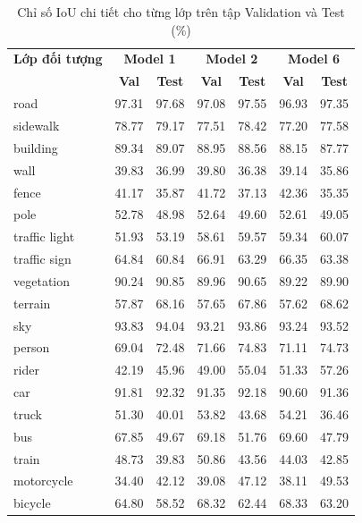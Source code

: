 \documentclass[a4paper,12pt]{report}
\begin{document}
\begin{table}[H]
\centering
\caption{Chỉ số IoU chi tiết cho từng lớp trên tập Validation và Test (\%)}
\label{tab:class_iou_comparison}
\footnotesize
\begin{tabular}{|l|c|c|c|c|c|c|}
\hline
\textbf{Lớp đối tượng} & \multicolumn{2}{c|}{\textbf{Model 1}} & \multicolumn{2}{c|}{\textbf{Model 2}} & \multicolumn{2}{c|}{\textbf{Model 6}} \\
 & \textbf{Val} & \textbf{Test} & \textbf{Val} & \textbf{Test} & \textbf{Val} & \textbf{Test} \\
\hline
road & 97.31 & 97.68 & 97.08 & 97.55 & 96.93 & 97.35 \\
sidewalk & 78.77 & 79.17 & 77.51 & 78.42 & 77.20 & 77.58 \\
building & 89.34 & 89.07 & 88.95 & 88.56 & 88.15 & 87.77 \\
wall & 39.83 & 36.99 & 39.80 & 36.38 & 39.14 & 35.86 \\
fence & 41.17 & 35.87 & 41.72 & 37.13 & 42.36 & 35.35 \\
pole & 52.78 & 48.98 & 52.64 & 49.60 & 52.61 & 49.05 \\
traffic light & 51.93 & 53.19 & 58.61 & 59.57 & 59.34 & 60.07 \\
traffic sign & 64.84 & 60.84 & 66.91 & 63.29 & 66.35 & 63.38 \\
vegetation & 90.24 & 90.85 & 89.96 & 90.65 & 89.22 & 89.90 \\
terrain & 57.87 & 68.16 & 57.65 & 67.86 & 57.62 & 68.62 \\
sky & 93.83 & 94.04 & 93.21 & 93.86 & 93.24 & 93.52 \\
person & 69.04 & 72.48 & 71.66 & 74.83 & 71.11 & 74.73 \\
rider & 42.19 & 45.96 & 49.00 & 55.04 & 51.33 & 57.26 \\
car & 91.81 & 92.32 & 91.35 & 92.18 & 90.60 & 91.36 \\
truck & 51.30 & 40.01 & 53.82 & 43.68 & 54.21 & 36.46 \\
bus & 67.85 & 49.67 & 69.18 & 51.76 & 69.60 & 47.79 \\
train & 48.73 & 39.83 & 50.86 & 43.56 & 44.03 & 42.85 \\
motorcycle & 34.40 & 42.12 & 39.08 & 47.12 & 38.11 & 49.53 \\
bicycle & 64.80 & 58.52 & 68.32 & 62.44 & 68.33 & 63.20 \\
\hline
\end{tabular}
\end{table}
\end{document}
